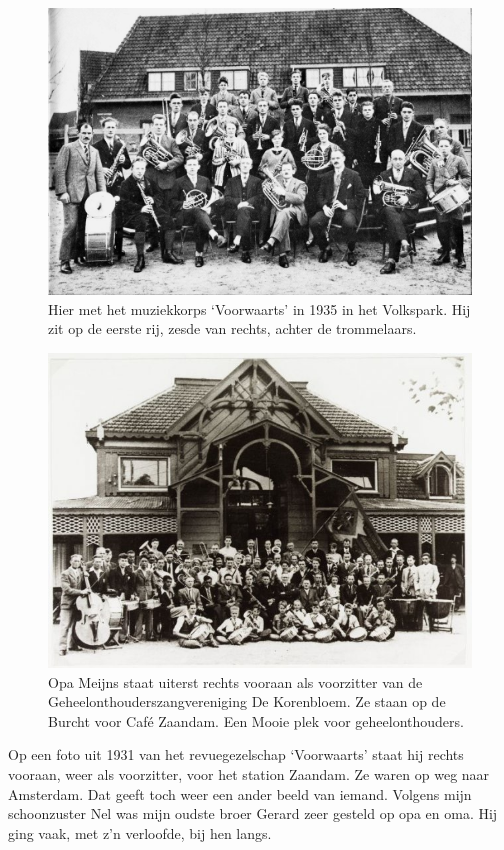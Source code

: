 \documentclass[12pt,twoside, openright]{memoir}
\begin{document}
\begin{figure}
\includegraphics[width=\textwidth]{img/ch2/ch2-afb04}
\caption*{\footnotesize Hier met het muziekkorps `Voorwaarts' in 1935 in het Volkspark. Hij zit op de eerste rij, zesde van rechts, achter de trommelaars.}
\end{figure}

\begin{figure}
\includegraphics[width=\textwidth]{img/ch2/ch2-afb05}
\caption*{\footnotesize Opa Meijns staat uiterst rechts vooraan als voorzitter van de Geheelonthouderszangvereniging De Korenbloem. Ze staan op de Burcht voor Café Zaandam. Een Mooie plek voor geheelonthouders.}
\end{figure}

Op een foto uit 1931 van het revuegezelschap `Voorwaarts' staat hij rechts vooraan, weer als voorzitter, voor het station Zaandam. Ze waren op weg naar Amsterdam. Dat geeft toch weer een ander beeld van iemand. Volgens mijn schoonzuster Nel was mijn oudste broer Gerard zeer gesteld op opa en oma. Hij ging vaak, met z’n verloofde, bij hen langs. 
\end{document}
